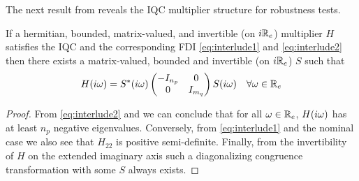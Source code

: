 The next result from \cite{goh96} reveals the IQC multiplier structure for robustness tests. 

\begin{thm} If a hermitian, bounded, matrix-valued, and invertible (on $i\mathbb{R}_e$) multiplier $H$ satisfies the 
IQC and the corresponding FDI \eqref{eq:interlude1} and \eqref{eq:interlude2} then there exists a matrix-valued, bounded and 
invertible (on $i\mathbb{R}_e$) $S$ such that 
\[
H(i\omega) = S^*(i\omega)\begin{pmatrix}-I_{n_p}&0\\0&I_{m_q}\end{pmatrix}S(i\omega) \quad \forall\omega\in\mathbb{R}_e
\]
\end{thm}
\begin{proof} From \eqref{eq:interlude2} and  we can conclude that
for all $\omega\in\mathbb{R}_e$, $H(i\omega)$ has at least $n_p$ negative eigenvalues. Conversely, from
\eqref{eq:interlude1} and the nominal case we also see that $H_{22}$ is positive semi-definite. 
Finally, from the invertibility of $H$ on the extended imaginary axis such a diagonalizing 
congruence transformation with some $S$ always exists. 
\end{proof}





















